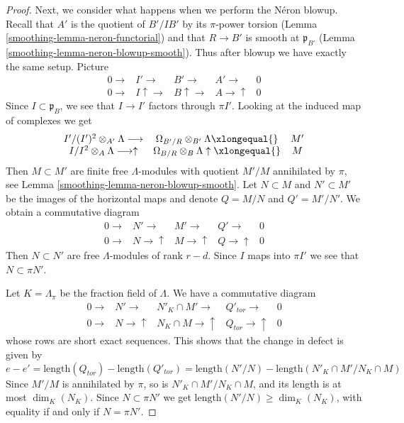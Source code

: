 \begin{proof}
\medskip\noindent
Next, we consider what happens when we perform the N\'eron blowup.
Recall that $A'$ is the quotient of $B'/IB'$ by its $\pi$-power
torsion (Lemma \ref{smoothing-lemma-neron-functorial}) and that $R \to B'$ is smooth at
$\mathfrak p_{B'}$ (Lemma \ref{smoothing-lemma-neron-blowup-smooth}).
Thus after blowup we have exactly the same setup. Picture
$$
\begin{array}{ccccc}0 \longrightarrow & I' \longrightarrow & B' \longrightarrow & A' \longrightarrow & 0 \\ 0 \longrightarrow & I \uparrow\longrightarrow & B \uparrow\longrightarrow & A \longrightarrow\uparrow & 0\end{array}
$$
Since $I \subset \mathfrak p_B$, we see that $I \to I'$
factors through $\pi I'$. Looking at the induced map of
complexes we get
$$
\begin{array}{ccc}I'/(I')^2 \otimes_{A'} \Lambda \longrightarrow & \Omega_{B'/R} \otimes_{B'} \Lambda \xlongequal{} & M' \\ I/I^2 \otimes_A \Lambda \longrightarrow\uparrow & \Omega_{B/R} \otimes_B \Lambda \uparrow\xlongequal{} & M\end{array}
$$
Then $M \subset M'$ are finite free $\Lambda$-modules with quotient
$M'/M$ annihilated by $\pi$, see Lemma \ref{smoothing-lemma-neron-blowup-smooth}.
Let $N \subset M$ and $N' \subset M'$ be the images of the horizontal
maps and denote $Q = M/N$ and $Q' = M'/N'$.
We obtain a commutative diagram
$$
\begin{array}{ccccc}0 \longrightarrow & N' \longrightarrow & M' \longrightarrow & Q' \longrightarrow & 0 \\ 0 \longrightarrow & N \longrightarrow\uparrow & M \longrightarrow\uparrow & Q \longrightarrow\uparrow & 0\end{array}
$$
Then $N \subset N'$ are free $\Lambda$-modules of rank $r - d$.
Since $I$ maps into $\pi I'$ we see that $N \subset \pi N'$.

\medskip\noindent
Let $K = \Lambda_\pi$ be the fraction field of $\Lambda$.
We have a commutative diagram
$$
\begin{array}{ccccc}0 \longrightarrow & N' \longrightarrow & N'_K \cap M' \longrightarrow & Q'_{tor} \longrightarrow & 0 \\ 0 \longrightarrow & N \longrightarrow\uparrow & N_K \cap M \longrightarrow\uparrow & Q_{tor} \longrightarrow\uparrow & 0\end{array}
$$
whose rows are short exact sequences. This shows that the change in defect
is given by
$$
e - e' =
\text{length}(Q_{tor}) - \text{length}(Q'_{tor})
=
\text{length}(N'/N) - \text{length}(N'_K \cap M' / N_K \cap M)
$$
Since $M'/M$ is annihilated by $\pi$, so is $N'_K \cap M' / N_K \cap M$,
and its length is at most $\dim_K(N_K)$.
Since $N \subset \pi N'$ we get $\text{length}(N'/N) \ge \dim_K(N_K)$,
with equality if and only if $N = \pi N'$.


\end{proof}
